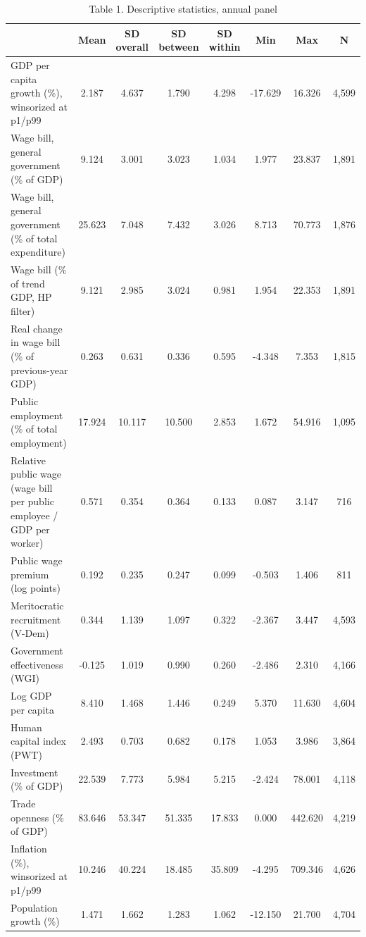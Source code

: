 \begin{table}[htbp]\centering\footnotesize
\providecommand{\sym}[1]{\ensuremath{^{#1}}}
\caption{Table 1. Descriptive statistics, annual panel}\label{tab:Table1_descriptives}
\begin{tabular}{l*{7}{c}}
\toprule
 & Mean & SD overall & SD between & SD within & Min & Max & N \\
\midrule
GDP per capita growth (\%), winsorized at p1/p99 & 2.187 & 4.637 & 1.790 & 4.298 & -17.629 & 16.326 & 4,599 \\
Wage bill, general government (\% of GDP) & 9.124 & 3.001 & 3.023 & 1.034 & 1.977 & 23.837 & 1,891 \\
Wage bill, general government (\% of total expenditure) & 25.623 & 7.048 & 7.432 & 3.026 & 8.713 & 70.773 & 1,876 \\
Wage bill (\% of trend GDP, HP filter) & 9.121 & 2.985 & 3.024 & 0.981 & 1.954 & 22.353 & 1,891 \\
Real change in wage bill (\% of previous-year GDP) & 0.263 & 0.631 & 0.336 & 0.595 & -4.348 & 7.353 & 1,815 \\
Public employment (\% of total employment) & 17.924 & 10.117 & 10.500 & 2.853 & 1.672 & 54.916 & 1,095 \\
Relative public wage (wage bill per public employee / GDP per worker) & 0.571 & 0.354 & 0.364 & 0.133 & 0.087 & 3.147 & 716 \\
Public wage premium (log points) & 0.192 & 0.235 & 0.247 & 0.099 & -0.503 & 1.406 & 811 \\
Meritocratic recruitment (V-Dem) & 0.344 & 1.139 & 1.097 & 0.322 & -2.367 & 3.447 & 4,593 \\
Government effectiveness (WGI) & -0.125 & 1.019 & 0.990 & 0.260 & -2.486 & 2.310 & 4,166 \\
Log GDP per capita & 8.410 & 1.468 & 1.446 & 0.249 & 5.370 & 11.630 & 4,604 \\
Human capital index (PWT) & 2.493 & 0.703 & 0.682 & 0.178 & 1.053 & 3.986 & 3,864 \\
Investment (\% of GDP) & 22.539 & 7.773 & 5.984 & 5.215 & -2.424 & 78.001 & 4,118 \\
Trade openness (\% of GDP) & 83.646 & 53.347 & 51.335 & 17.833 & 0.000 & 442.620 & 4,219 \\
Inflation (\%), winsorized at p1/p99 & 10.246 & 40.224 & 18.485 & 35.809 & -4.295 & 709.346 & 4,626 \\
Population growth (\%) & 1.471 & 1.662 & 1.283 & 1.062 & -12.150 & 21.700 & 4,704 \\

\end{tabular}
\end{table}
